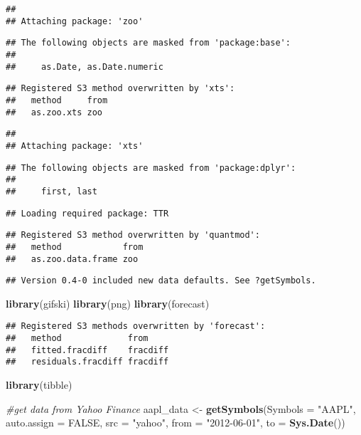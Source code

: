 \documentclass[]{article}
\newenvironment{Shaded}{\begin{snugshade}}{\end{snugshade}}
\newcommand{\CommentTok}[1]{\textcolor[rgb]{0.56,0.35,0.01}{\textit{#1}}}
\newcommand{\DataTypeTok}[1]{\textcolor[rgb]{0.13,0.29,0.53}{#1}}
\newcommand{\KeywordTok}[1]{\textcolor[rgb]{0.13,0.29,0.53}{\textbf{#1}}}
\newcommand{\NormalTok}[1]{#1}
\newcommand{\OtherTok}[1]{\textcolor[rgb]{0.56,0.35,0.01}{#1}}
\newcommand{\StringTok}[1]{\textcolor[rgb]{0.31,0.60,0.02}{#1}}
\begin{document}
\begin{verbatim}
## 
## Attaching package: 'zoo'
\end{verbatim}

\begin{verbatim}
## The following objects are masked from 'package:base':
## 
##     as.Date, as.Date.numeric
\end{verbatim}

\begin{verbatim}
## Registered S3 method overwritten by 'xts':
##   method     from
##   as.zoo.xts zoo
\end{verbatim}

\begin{verbatim}
## 
## Attaching package: 'xts'
\end{verbatim}

\begin{verbatim}
## The following objects are masked from 'package:dplyr':
## 
##     first, last
\end{verbatim}

\begin{verbatim}
## Loading required package: TTR
\end{verbatim}

\begin{verbatim}
## Registered S3 method overwritten by 'quantmod':
##   method            from
##   as.zoo.data.frame zoo
\end{verbatim}

\begin{verbatim}
## Version 0.4-0 included new data defaults. See ?getSymbols.
\end{verbatim}

\begin{Shaded}
\begin{Highlighting}[]
\KeywordTok{library}\NormalTok{(gifski)}
\KeywordTok{library}\NormalTok{(png)}
\KeywordTok{library}\NormalTok{(forecast)}
\end{Highlighting}
\end{Shaded}

\begin{verbatim}
## Registered S3 methods overwritten by 'forecast':
##   method             from    
##   fitted.fracdiff    fracdiff
##   residuals.fracdiff fracdiff
\end{verbatim}

\begin{Shaded}
\begin{Highlighting}[]
\KeywordTok{library}\NormalTok{(tibble)}


\CommentTok{#get data from Yahoo Finance}
\NormalTok{aapl_data <-}\StringTok{ }\KeywordTok{getSymbols}\NormalTok{(}\DataTypeTok{Symbols =} \StringTok{"AAPL"}\NormalTok{, }
                        \DataTypeTok{auto.assign =} \OtherTok{FALSE}\NormalTok{, }
                        \DataTypeTok{src =} \StringTok{"yahoo"}\NormalTok{,}
                        \DataTypeTok{from =} \StringTok{"2012-06-01"}\NormalTok{, }
                        \DataTypeTok{to =} \KeywordTok{Sys.Date}\NormalTok{())}
\end{Highlighting}
\end{Shaded}
\end{document}
